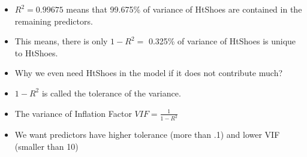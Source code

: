 \documentclass[
  ignorenonframetext,
]{beamer}
\begin{document}
\begin{frame}{}
\protect\hypertarget{section-10}{}
\begin{itemize}
\item
  \(R^2 = 0.99675\) means that 99.675\% of variance of HtShoes are
  contained in the remaining predictors.
\item
  This means, there is only \(1-R^2 =\) 0.325\% of variance of HtShoes
  is unique to HtShoes.
\item
  Why we even need HtShoes in the model if it does not contribute much?
\end{itemize}
\end{frame}

\begin{frame}{}
\protect\hypertarget{section-11}{}
\begin{itemize}
\item
  \(1-R^2\) is called the tolerance of the variance.
\item
  The variance of Inflation Factor \(VIF = \frac{1}{1-R^2}\)
\item
  We want predictors have higher tolerance (more than .1) and lower VIF
  (smaller than 10)
\end{itemize}
\end{frame}
\end{document}
